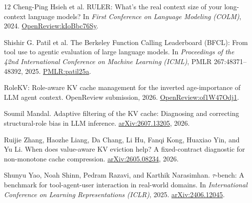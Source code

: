 \begin{thebibliography}{12}
Cheng-Ping Hsieh et al.
\newblock RULER: What's the real context size of your long-context language models?
\newblock In \emph{First Conference on Language Modeling (COLM)}, 2024.
\href{https://openreview.net/forum?id=kIoBbc76Sy}{OpenReview:kIoBbc76Sy}.

Shishir G. Patil et al.
\newblock The Berkeley Function Calling Leaderboard (BFCL): From tool use to
agentic evaluation of large language models.
\newblock In \emph{Proceedings of the 42nd International Conference on Machine
Learning (ICML)}, PMLR 267:48371--48392, 2025.
\href{https://proceedings.mlr.press/v267/patil25a.html}{PMLR:patil25a}.

RoleKV: Role-aware KV cache management for the inverted age-importance of LLM
agent context.
\newblock OpenReview submission, 2026.
\href{https://openreview.net/forum?id=of1W47Odj1}{OpenReview:of1W47Odj1}.

Soumil Mandal.
\newblock Adaptive filtering of the KV cache: Diagnosing and correcting
structural-role bias in LLM inference.
\newblock \href{https://arxiv.org/abs/2607.13205}{arXiv:2607.13205}, 2026.

Ruijie Zhang, Haozhe Liang, Da Chang, Li Hu, Fanqi Kong, Huaxiao Yin, and Yu Li.
\newblock When does value-aware KV eviction help?  A fixed-contract diagnostic
for non-monotone cache compression.
\newblock \href{https://arxiv.org/abs/2605.08234}{arXiv:2605.08234}, 2026.

Shunyu Yao, Noah Shinn, Pedram Razavi, and Karthik Narasimhan.
\newblock $\tau$-bench: A benchmark for tool-agent-user interaction in real-world
domains.
\newblock In \emph{International Conference on Learning Representations (ICLR)},
2025.  \href{https://arxiv.org/abs/2406.12045}{arXiv:2406.12045}.

\end{thebibliography}
\endgroup
